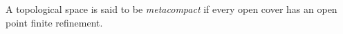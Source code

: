 \documentclass[12pt]{article}
\begin{document}
A topological space is said to be {\it metacompact} if every open cover  has an  open point finite refinement.
\end{document}
